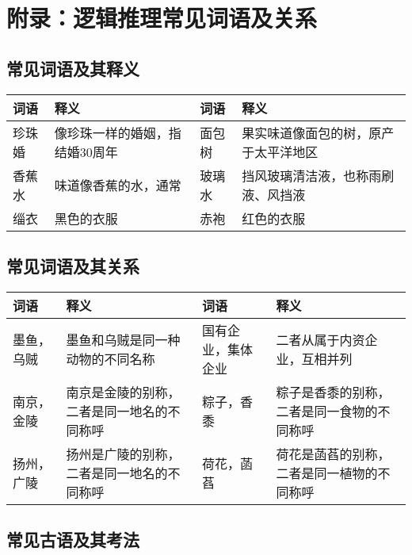 \section{附录：逻辑推理常见词语及关系}
\label{trd:appendix}

\subsection{常见词语及其释义}

\begin{longtable}{|p{}|p{}|p{}|p{}|}
    \hline
    \textbf{词语} & \textbf{释义}      & \textbf{词语} & \textbf{释义}        \\
    \hline
    珍珠婚         & 像珍珠一样的婚姻，指结婚30周年 & 面包树         & 果实味道像面包的树，原产于太平洋地区 \\
    \hline
    香蕉水         & 味道像香蕉的水，通常       & 玻璃水         & 挡风玻璃清洁液，也称雨刷液、风挡液  \\
    \hline
    缁衣          & 黑色的衣服            & 赤袍          & 红色的衣服              \\
    \hline
\end{longtable}

\subsection{常见词语及其关系}

\begin{longtable}{|p{}|p{}|p{}|p{}|}
    \hline
    \textbf{词语} & \textbf{释义}           & \textbf{词语} & \textbf{释义}           \\
    \hline
    墨鱼，乌贼       & 墨鱼和乌贼是同一种动物的不同名称      & 国有企业，集体企业   & 二者从属于内资企业，互相并列        \\
    \hline
    南京，金陵       & 南京是金陵的别称，二者是同一地名的不同称呼 & 粽子，香黍       & 粽子是香黍的别称，二者是同一食物的不同称呼 \\
    \hline
    扬州，广陵       & 扬州是广陵的别称，二者是同一地名的不同称呼 & 荷花，菡萏       & 荷花是菡萏的别称，二者是同一植物的不同称呼 \\
    \hline
\end{longtable}

\subsection{常见古语及其考法}

